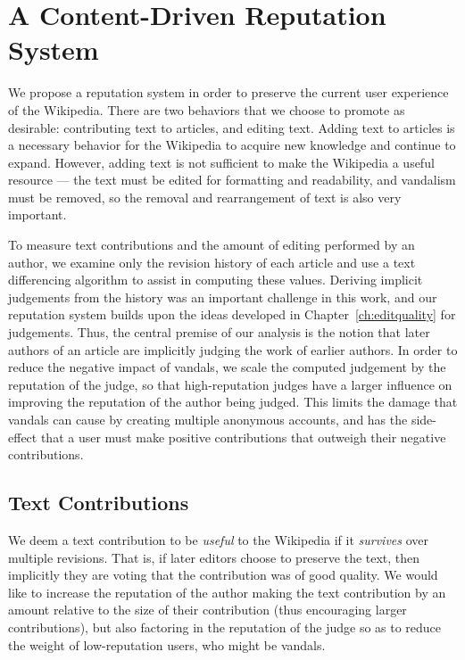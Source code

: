 \section{A Content-Driven Reputation System} 

We propose a  reputation system in
order to preserve the current user experience of the Wikipedia.
There are two behaviors that we choose to promote as desirable:
contributing text to articles, and editing text.
Adding text to articles is a necessary behavior for the Wikipedia
to acquire new knowledge and continue to expand.
However, adding text is not sufficient to make the Wikipedia a
useful resource --- the text must be edited for formatting and
readability, and vandalism must be removed, so the removal and
rearrangement of text is also very important.

To measure text contributions and the amount of editing performed
by an author, we examine only the revision history of each article
and use a text differencing algorithm to assist in computing these values.
Deriving implicit judgements from the history was an important
challenge in this work, and our reputation system builds upon
the ideas developed in Chapter~\ref{ch:editquality} for judgements.
Thus, the central premise of our analysis is the notion that later
authors of an article are implicitly judging the work of earlier authors.
In order to reduce the negative impact of vandals, we scale the
computed judgement by the reputation of the judge, so that high-reputation
judges have a larger influence on improving the reputation of the
author being judged.
This limits the damage that vandals can cause by creating multiple
anonymous accounts, and has the side-effect that a user must make
positive contributions that outweigh their negative contributions.

\subsection{Text Contributions} 

We deem a text contribution to be \textit{useful} to the Wikipedia
if it \textit{survives} over multiple revisions.
That is, if later editors choose to preserve the text, then
implicitly they are voting that the contribution was of good
quality.
We would like to increase the reputation of the author making
the text contribution by an amount relative to the size of their
contribution (thus encouraging larger contributions),
but also factoring in the reputation of the judge so as to reduce
the weight of low-reputation users, who might be vandals.

